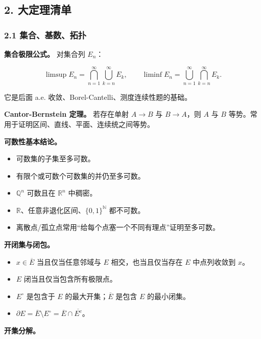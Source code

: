 \documentclass[
UTF8]{ctexart}
\providecommand{\tightlist}{%
\setlength{\itemsep}{0pt}\setlength{\parskip}{0pt}}
\begin{document}
\subsection{2. 大定理清单}\label{ux5927ux5b9aux7406ux6e05ux5355}

\subsubsection{2.1
集合、基数、拓扑}\label{ux96c6ux5408ux57faux6570ux62d3ux6251}

\textbf{集合极限公式。} 对集合列 \(E_n\)：

\[
  \limsup E_n=\bigcap_{n=1}^{\infty}\bigcup_{k=n}^{\infty}E_k,\qquad
  \liminf E_n=\bigcup_{n=1}^{\infty}\bigcap_{k=n}^{\infty}E_k.
\]

它是后面 a.e. 收敛、Borel-Cantelli、测度连续性题的基础。

\textbf{Cantor-Bernstein 定理。} 若存在单射 \(A\to B\) 与 \(B\to A\)，则
\(A\) 与 \(B\) 等势。常用于证明区间、直线、平面、连续统之间等势。

\textbf{可数性基本结论。}

\begin{itemize}
    \tightlist
  \item
    可数集的子集至多可数。
  \item
    有限个或可数个可数集的并仍至多可数。
  \item
    \(\mathbb Q^n\) 可数且在 \(\mathbb R^n\) 中稠密。
  \item
    \(\mathbb R\)、任意非退化区间、\(\{0,1\}^{\mathbb N}\) 都不可数。
  \item
    离散点/孤立点常用``给每个点塞一个不同有理点''证明至多可数。
\end{itemize}

\textbf{开闭集与闭包。}

\begin{itemize}
    \tightlist
  \item
    \(x\in\overline E\) 当且仅当任意邻域与 \(E\) 相交，也当且仅当存在
    \(E\) 中点列收敛到 \(x\)。
  \item
    \(E\) 闭当且仅当包含所有极限点。
  \item
    \(E^\circ\) 是包含于 \(E\) 的最大开集；\(\overline E\) 是包含 \(E\)
    的最小闭集。
  \item
    \(\partial E=\overline E\setminus E^\circ=\overline E\cap\overline{E^c}\)。
\end{itemize}

\textbf{开集分解。}
\end{document}
